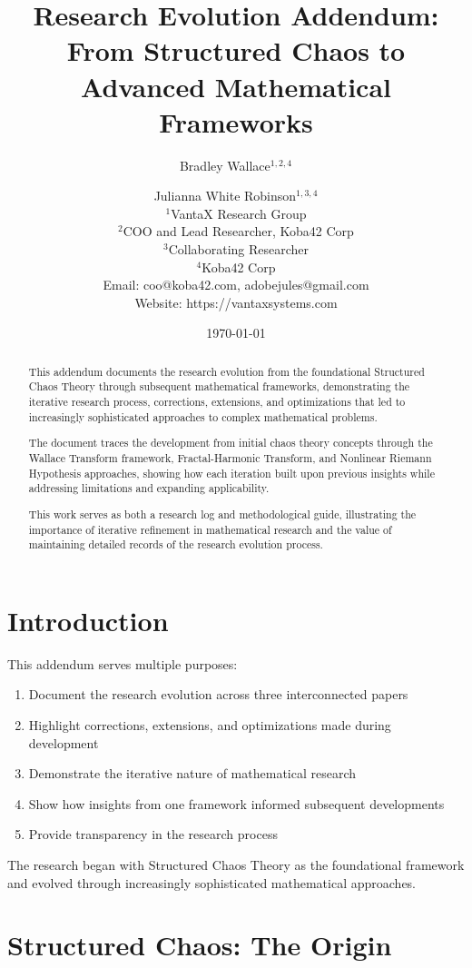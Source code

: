 \documentclass[12pt]{article}
\title{Research Evolution Addendum: From Structured Chaos to Advanced Mathematical Frameworks}
\author{
Bradley Wallace$^{1,2,4}$ \and Julianna White Robinson$^{1,3,4}$ \\
$^1$VantaX Research Group \\
$^2$COO and Lead Researcher, Koba42 Corp \\
$^3$Collaborating Researcher \\
$^4$Koba42 Corp \\
Email: coo@koba42.com, adobejules@gmail.com \\
Website: https://vantaxsystems.com
}
\date{\today}
\begin{document}
\maketitle

\begin{abstract}
This addendum documents the research evolution from the foundational Structured Chaos Theory through subsequent mathematical frameworks, demonstrating the iterative research process, corrections, extensions, and optimizations that led to increasingly sophisticated approaches to complex mathematical problems.

The document traces the development from initial chaos theory concepts through the Wallace Transform framework, Fractal-Harmonic Transform, and Nonlinear Riemann Hypothesis approaches, showing how each iteration built upon previous insights while addressing limitations and expanding applicability.

This work serves as both a research log and methodological guide, illustrating the importance of iterative refinement in mathematical research and the value of maintaining detailed records of the research evolution process.
\end{abstract}

\section{Introduction}

This addendum serves multiple purposes:
\begin{enumerate}
    \item Document the research evolution across three interconnected papers
    \item Highlight corrections, extensions, and optimizations made during development
    \item Demonstrate the iterative nature of mathematical research
    \item Show how insights from one framework informed subsequent developments
    \item Provide transparency in the research process
\end{enumerate}

The research began with Structured Chaos Theory as the foundational framework and evolved through increasingly sophisticated mathematical approaches.

\section{Structured Chaos: The Origin}
\end{document}
